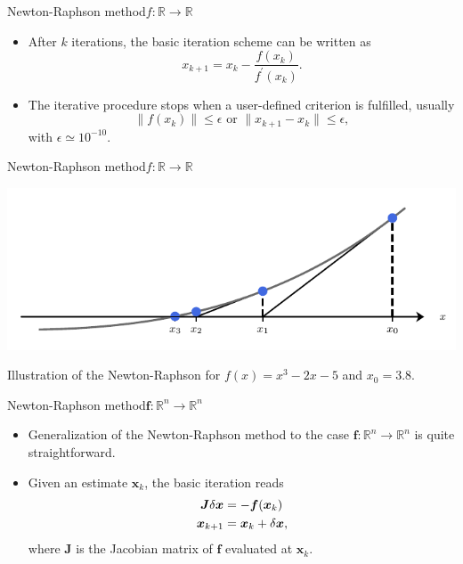 \documentclass[usenames,dvipsnames,svgnames,10pt,aspectratio=169]{beamer}
\begin{document}
\begin{frame}[t, c]{Newton-Raphson method}{$f : \mathbb{R} \to \mathbb{R}$}
	\begin{itemize}
		\item After $k$ iterations, the basic iteration scheme can be written as
		$$
		x_{k+1} = x_k - \displaystyle \frac{f(x_k)}{f^{\prime}(x_k)}.
		$$

		\bigskip

		\item The iterative procedure stops when a user-defined criterion is fulfilled, usually
		$$
		\| f(x_k) \| \le \epsilon \text{ or } \| x_{k+1} - x_k \| \le \epsilon,
		$$
		with $\epsilon \simeq 10^{-10}$.
	\end{itemize}

	\vspace{1cm}
\end{frame}


\begin{frame}[t, c]{Newton-Raphson method}{$f : \mathbb{R} \to \mathbb{R}$}
	\centering

	\includegraphics[width=.75\textwidth]{Newton_method}

	\bigskip

	Illustration of the Newton-Raphson for $f(x) = x^3 - 2x - 5$ and $x_0=3.8$.

	\vspace{1cm}
\end{frame}


\begin{frame}[t, c]{Newton-Raphson method}{${\bm f} : \mathbb{R}^n \to \mathbb{R}^n$}

	\begin{itemize}
		\item Generalization of the Newton-Raphson method to the case ${\bm f} : \mathbb{R}^n \to \mathbb{R}^n$ is quite straightforward.

		\bigskip

		\item Given an estimate ${\bm x}_k$, the basic iteration reads
		\begin{equation}
			\begin{aligned}
				{\bm J} \delta {\bm x} & = - {\bm f}({\bm x}_k) \\
				{\bm x}_{k+1} & = {\bm x}_k + \delta {\bm x},
			\end{aligned}
			\notag
		\end{equation}
		where ${\bm J}$ is the Jacobian matrix of ${\bm f}$ evaluated at ${\bm x}_k$.
	\end{itemize}

	\vspace{1cm}
\end{frame}
\end{document}
